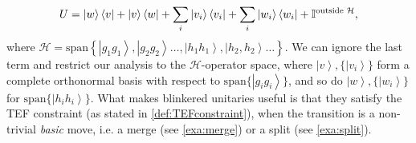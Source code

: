 \documentclass{theoretics}
\begin{document}
\begin{displaymath}
  U=\left|w\right\rangle \left\langle v\right|+\left|v\right\rangle \left\langle w\right|+\sum_{i}\left|v_{i}\right\rangle \left\langle v_{i}\right|+\sum_{i}\left|w_{i}\right\rangle \left\langle w_{i}\right|+\mathbb{I}^{\text{outside }\text{\ensuremath{\mathcal{H}}}},
\end{displaymath}
where $\mathcal{H}=\text{span}\left\{ \left|g_{1}g_{1}\right\rangle ,\left|g_{2}g_{2}\right\rangle \dots,\left|h_{1}h_{1}\right\rangle ,\left|h_{2},h_{2}\right\rangle \dots\right\} $.
We can ignore the last term and restrict our analysis
to the $\mathcal{H}$-operator space, where $\left|v\right\rangle ,\{\left|v_{i}\right\rangle \}$
form a complete orthonormal basis with respect to $\text{span}\{\left|g_{i}g_{i}\right\rangle \}$, and so do $\left|w\right\rangle ,\{\left|w_{i}\right\rangle \}$
for $\text{span}\{\left|h_{i}h_{i}\right\rangle \}$.
What makes blinkered unitaries useful is that they satisfy the TEF constraint (as stated in \cref{def:TEFconstraint}), when the transition is a non-trivial \emph{basic} move, i.e. a merge (see \cref{exa:merge}) or a split (see \cref{exa:split}).
%
%
\end{document}
